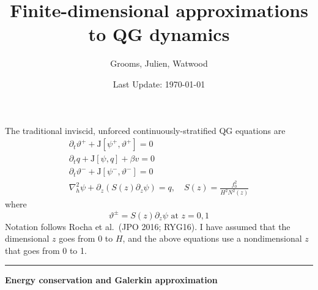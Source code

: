 \documentclass[10pt]{article}
\title{Finite-dimensional approximations to QG dynamics}
\author{Grooms, Julien, Watwood}
\date{Last Update: \today}
\newcommand{\pd}[1]{\partial_{#1}}
\newcommand{\tJ}{\text{J}}
\begin{document}
\maketitle

The traditional inviscid, unforced continuously-stratified QG equations are
\begin{gather}\label{eqn:QG1}
\pd{t}\vartheta^+ + \tJ[\psi^+,\vartheta^+] = 0\\\label{eqn:QG2}
\pd{t}q+\tJ[\psi,q]+\beta v = 0\\\label{eqn:QG3}
\pd{t}\vartheta^-+ \tJ[\psi^-,\vartheta^-] = 0\\
\nabla_h^2\psi + \pd{z}\left(S(z)\pd{z}\psi\right) = q,\quad S(z) = \frac{f_0^2}{H^2N^2(z)}
\end{gather}
where 
\begin{equation}
\vartheta^\pm= S(z)\pd{z}\psi\text{ at }z=0,1
\end{equation}
Notation follows Rocha et al.~(JPO 2016; RYG16).
I have assumed that the dimensional $z$ goes from $0$ to $H$, and the above equations use a nondimensional $z$ that goes from 0 to 1.\\

\hrule
\begin{center}{\bf Energy conservation and Galerkin approximation}\end{center}
\end{document}

